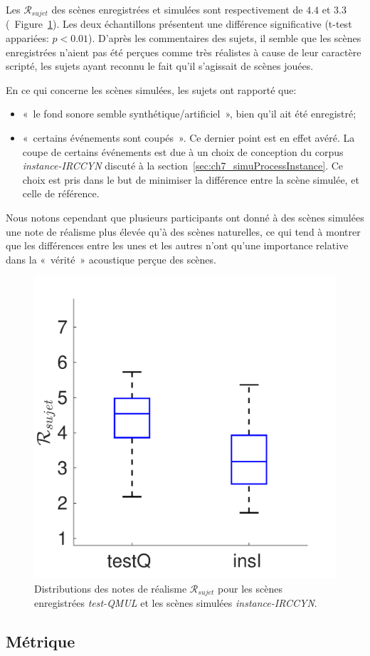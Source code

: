 Les $\mathcal{R}_{sujet}$ des scènes enregistrées et simulées sont respectivement de $4.4$ et $3.3$ (\cf~Figure~\ref{fig:xpRealism}). Les deux échantillons présentent une différence significative (t-test appariées: $p<0.01$). D'après les commentaires des sujets, il semble que les scènes enregistrées n'aient pas été perçues comme très réalistes à cause de leur caractère scripté, les sujets ayant reconnu le fait qu'il s'agissait de scènes jouées. 

En ce qui concerne les scènes simulées, les sujets ont rapporté que: 

\begin{itemize}
\item «~le fond sonore semble synthétique/artificiel~», bien qu'il ait été enregistré;
\item «~certains événements sont coupés~». Ce dernier point est en effet avéré. La coupe de certains événements est due à un choix de conception du corpus \emph{instance-IRCCYN} discuté à la section~\ref{sec:ch7_simuProcessInstance}. Ce choix est pris dans le but de minimiser la différence entre la scène simulée, et celle de référence. 
\end{itemize}

Nous notons cependant que plusieurs participants ont donné à des scènes simulées une note de réalisme plus élevée qu'à des scènes naturelles, ce qui tend à montrer que les différences entre les unes et les autres n'ont qu'une importance relative dans la «~vérité~» acoustique perçue des scènes.

\begin{figure}[t]
\begin{center}
\includegraphics[width=.33\textwidth]{gfx/ch_7/xp_realism_2}
\caption{Distributions des notes de réalisme $\mathcal{R}_{sujet}$ pour les scènes enregistrées \emph{test-QMUL} et les scènes simulées \emph{instance-IRCCYN}.}
\label{fig:xpRealism} 
\end{center}
\end{figure}

\subsection{Métrique}
\label{sec:ch7_dcase2013metrique}

